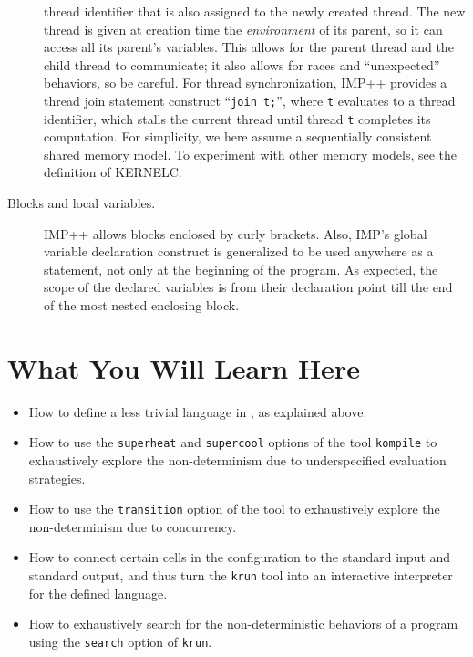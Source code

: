 \documentclass{article}
\begin{document}
\begin{kdefinition}
\begin{kblock}[text]
\begin{description}
thread identifier that is also assigned to the newly created thread.
The new thread is given at creation time the {\em environment} of its
parent, so it can access all its parent's variables.  This allows for
the parent thread and the child thread to communicate; it also allows
for races and ``unexpected'' behaviors, so be careful.
For thread synchronization, IMP++ provides a thread join statement
construct ``\texttt{join t;}'', where \texttt{t} evaluates to a thread
identifier, which stalls the current thread until thread \texttt{t}
completes its computation.  For simplicity, we here assume a
sequentially consistent shared memory model.  To experiment with other
memory models, see the definition of KERNELC\@.
\item [Blocks and local variables.]  IMP++ allows blocks enclosed by
curly brackets.  Also, IMP's global variable declaration construct is
generalized to be used anywhere as a statement, not only at the
beginning of the program.  As expected, the scope of the declared
variables is from their declaration point till the end of the most
nested enclosing block.
\end{description} 

\section{What You Will Learn Here}

\begin{itemize}
\item How to define a less trivial language in \K, as explained above.
\item How to use the \texttt{superheat} and \texttt{supercool}
options of the \K tool \texttt{kompile} to exhaustively explore the
non-determinism due to underspecified evaluation strategies.
\item How to use the \texttt{transition} option of the \K tool to
exhaustively explore the non-determinism due to concurrency.
\item How to connect certain cells in the configuration to the
standard input and standard output, and thus turn the \texttt{krun}
tool into an interactive interpreter for the defined language.
\item How to exhaustively search for the non-deterministic behaviors
of a program using the \texttt{search} option of \texttt{krun}.
\end{itemize}
\end{kblock}
\begin{module}{}
\begin{kblock}[text]

\end{kblock}
\end{module}
\end{kdefinition}
\end{document}
